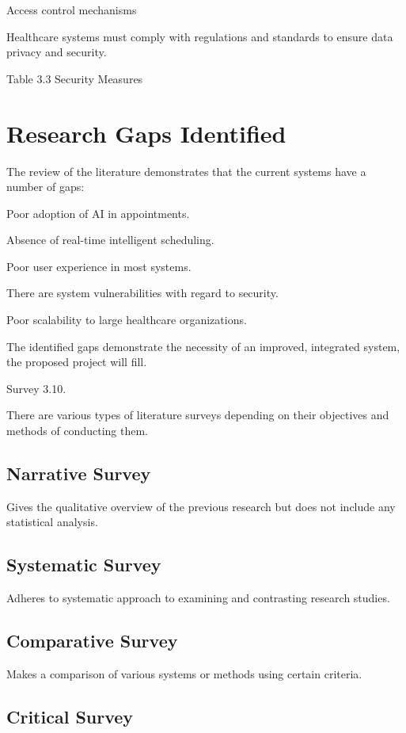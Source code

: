Access control mechanisms

Healthcare systems must comply with regulations and standards to ensure data privacy and security.

Table 3.3 Security Measures

\section{Research Gaps Identified}

The review of the literature demonstrates that the current systems have a number of gaps:

Poor adoption of AI in appointments.

Absence of real-time intelligent scheduling.

Poor user experience in most systems.

There are system vulnerabilities with regard to security.

Poor scalability to large healthcare organizations.

The identified gaps demonstrate the necessity of an improved, integrated system, the proposed project will fill.

Survey 3.10.

There are various types of literature surveys depending on their objectives and methods of conducting them.

\subsection{Narrative Survey}

Gives the qualitative overview of the previous research but does not include any statistical analysis.

\subsection{Systematic Survey}

Adheres to systematic approach to examining and contrasting research studies.

\subsection{Comparative Survey}

Makes a comparison of various systems or methods using certain criteria.

\subsection{Critical Survey}

